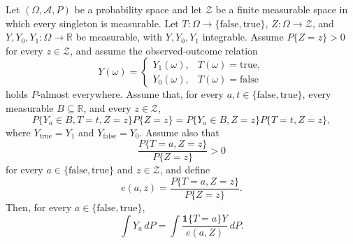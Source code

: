 \begin{theorem}
Let $(\Omega,\mathcal A,P)$ be a probability space and let $\mathcal Z$ be
a finite measurable space in which every singleton is measurable.  Let
$T:\Omega\to\{\mathrm{false},\mathrm{true}\}$,
$Z:\Omega\to\mathcal Z$, and
$Y,Y_0,Y_1:\Omega\to\mathbb R$ be measurable, with $Y,Y_0,Y_1$
integrable.  Assume $P\{Z=z\}>0$ for every $z\in\mathcal Z$, and assume
the observed-outcome relation
\[
  Y(\omega)=
  \begin{cases}Y_1(\omega),&T(\omega)=\mathrm{true},\\
                 Y_0(\omega),&T(\omega)=\mathrm{false}
  \end{cases}
\]
holds $P$-almost everywhere.  Assume that, for every
$a,t\in\{\mathrm{false},\mathrm{true}\}$, every measurable
$B\subseteq\mathbb R$, and every $z\in\mathcal Z$,
\[
 P\{Y_a\in B,T=t,Z=z\}P\{Z=z\}
 =
 P\{Y_a\in B,Z=z\}P\{T=t,Z=z\},
\]
where $Y_{\mathrm{true}}=Y_1$ and $Y_{\mathrm{false}}=Y_0$.  Assume also
that
\[
  \frac{P\{T=a,Z=z\}}{P\{Z=z\}}>0
\]
for every $a\in\{\mathrm{false},\mathrm{true}\}$ and
$z\in\mathcal Z$, and define
\[
  e(a,z)=\frac{P\{T=a,Z=z\}}{P\{Z=z\}}.
\]
Then, for every $a\in\{\mathrm{false},\mathrm{true}\}$,
\[
  \int Y_a\,dP
  =
  \int \frac{\mathbf 1\{T=a\}Y}{e(a,Z)}\,dP.
\]
\end{theorem}
